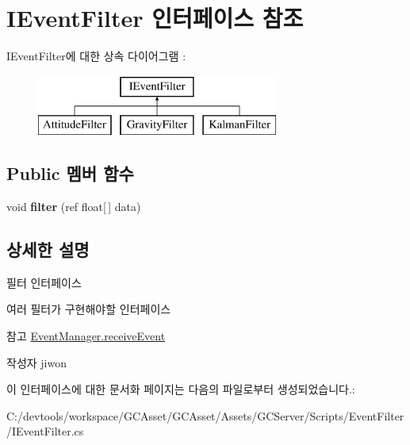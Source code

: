 \hypertarget{interface_i_event_filter}{}\section{I\+Event\+Filter 인터페이스 참조}
\label{interface_i_event_filter}
I\+Event\+Filter에 대한 상속 다이어그램 \+: \begin{figure}[H]
\begin{center}
\leavevmode
\includegraphics[height=2.000000cm]{interface_i_event_filter}
\end{center}
\end{figure}
\subsection*{Public 멤버 함수}
\begin{DoxyCompactItemize}
\item 
\hypertarget{interface_i_event_filter_aa70c90ea957214088b4c4cbb275a6714}{}void {\bfseries filter} (ref float\mbox{[}$\,$\mbox{]} data)\label{interface_i_event_filter_aa70c90ea957214088b4c4cbb275a6714}

\end{DoxyCompactItemize}


\subsection{상세한 설명}
필터 인터페이스

여러 필터가 구현해야할 인터페이스 \begin{DoxySeeAlso}{참고}
\hyperlink{class_event_manager_ae034ed89247a369411c89f135c836bd9}{Event\+Manager.\+receive\+Event} 
\end{DoxySeeAlso}
\begin{DoxyAuthor}{작성자}
jiwon 
\end{DoxyAuthor}


이 인터페이스에 대한 문서화 페이지는 다음의 파일로부터 생성되었습니다.\+:\begin{DoxyCompactItemize}
\item 
C\+:/devtools/workspace/\+G\+C\+Asset/\+G\+C\+Asset/\+Assets/\+G\+C\+Server/\+Scripts/\+Event\+Filter/I\+Event\+Filter.\+cs\end{DoxyCompactItemize}
